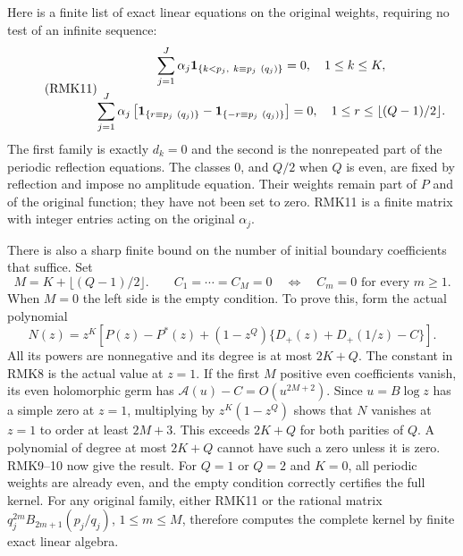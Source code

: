 Here is a finite list of exact linear equations on the original
weights, requiring no test of an infinite sequence:
\begin{equation}\tag{RMK11}
\begin{gathered}
 \sum_{j=1}^J\alpha_j
       {\bf1}_{\{k<p_j,\ k\equiv p_j\ (q_j)\}}=0,
                         \quad 1\leq k\leq K,\\
 \sum_{j=1}^J\alpha_j\left[
       {\bf1}_{\{r\equiv p_j\ (q_j)\}}
       -{\bf1}_{\{-r\equiv p_j\ (q_j)\}}\right]=0,
                         \quad1\leq r\leq\lfloor(Q-1)/2\rfloor.
\end{gathered}
\end{equation}
The first family is exactly $d_k=0$ and the second is the nonrepeated
part of the periodic reflection equations. The classes $0$, and
$Q/2$ when $Q$ is even, are fixed by reflection and impose no
amplitude equation. Their weights remain part of $P$ and of the
original function; they have not been set to zero. RMK11 is a
finite matrix with integer entries acting on the original $\alpha_j$.

There is also a sharp finite bound on the number of initial boundary
coefficients that suffice. Set
\begin{equation}\tag{RMK12}
 M=K+\lfloor(Q-1)/2\rfloor.
 \qquad
 C_1=\cdots=C_M=0
       \quad\Longleftrightarrow\quad C_m=0\text{ for every }m\geq1.
\end{equation}
When $M=0$ the left side is the empty condition. To prove this,
form the actual polynomial
\begin{equation}\tag{RMK13}
 N(z)=z^K\left[P(z)-P^*(z)
       +(1-z^Q)\{D_+(z)+D_+(1/z)-C\}\right].
\end{equation}
All its powers are nonnegative and its degree is at most $2K+Q$.
The constant in RMK8 is the actual value at $z=1$. If the first
$M$ positive even coefficients vanish, its even holomorphic germ
has $\mathcal A(u)-C=O(u^{2M+2})$. Since $u=B\log z$ has a
simple zero at $z=1$, multiplying by $z^K(1-z^Q)$ shows that
$N$ vanishes at $z=1$ to order at least $2M+3$. This exceeds
$2K+Q$ for both parities of $Q$. A polynomial of degree at most
$2K+Q$ cannot have such a zero unless it is zero. RMK9--10 now
give the result. For $Q=1$ or $Q=2$ and $K=0$, all periodic
weights are already even, and the empty condition correctly
certifies the full kernel. For any original family, either RMK11
or the rational matrix
$q_j^{2m}B_{2m+1}(p_j/q_j)$, $1\leq m\leq M$, therefore computes
the complete kernel by finite exact linear algebra.

